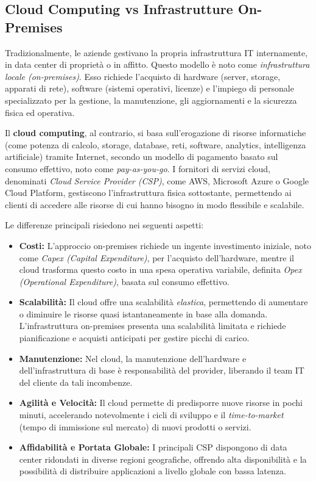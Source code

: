 \subsection{Cloud Computing vs Infrastrutture On-Premises}
\label{sec:cloud-vs-onprem}

Tradizionalmente, le aziende gestivano la propria infrastruttura IT internamente, in data center di proprietà o in affitto. Questo modello è noto come \textit{infrastruttura locale (on-premises)}. Esso richiede l'acquisto di hardware (server, storage, apparati di rete), software (sistemi operativi, licenze) e l'impiego di personale specializzato per la gestione, la manutenzione, gli aggiornamenti e la sicurezza fisica ed operativa.

Il \textbf{cloud computing}, al contrario, si basa sull'erogazione di risorse informatiche (come potenza di calcolo, storage, database, reti, software, analytics, intelligenza artificiale) tramite Internet, secondo un modello di pagamento basato sul consumo effettivo, noto come \textit{pay-as-you-go}. I fornitori di servizi cloud, denominati \textit{Cloud Service Provider (CSP)}, come AWS, Microsoft Azure o Google Cloud Platform, gestiscono l'infrastruttura fisica sottostante, permettendo ai clienti di accedere alle risorse di cui hanno bisogno in modo flessibile e scalabile.

Le differenze principali risiedono nei seguenti aspetti:
\begin{itemize}
    \item \textbf{Costi:} L'approccio on-premises richiede un ingente investimento iniziale, noto come \textit{Capex (Capital Expenditure)}, per l'acquisto dell'hardware, mentre il cloud trasforma questo costo in una spesa operativa variabile, definita \textit{Opex (Operational Expenditure)}, basata sul consumo effettivo.
    \item \textbf{Scalabilità:} Il cloud offre una scalabilità \textit{elastica}, permettendo di aumentare o diminuire le risorse quasi istantaneamente in base alla domanda. L'infrastruttura on-premises presenta una scalabilità limitata e richiede pianificazione e acquisti anticipati per gestire picchi di carico.
    \item \textbf{Manutenzione:} Nel cloud, la manutenzione dell'hardware e dell'infrastruttura di base è responsabilità del provider, liberando il team IT del cliente da tali incombenze.
    \item \textbf{Agilità e Velocità:} Il cloud permette di predisporre nuove risorse in pochi minuti, accelerando notevolmente i cicli di sviluppo e il \textit{time-to-market} (tempo di immissione sul mercato) di nuovi prodotti o servizi.
    \item \textbf{Affidabilità e Portata Globale:} I principali CSP dispongono di data center ridondati in diverse regioni geografiche, offrendo alta disponibilità e la possibilità di distribuire applicazioni a livello globale con bassa latenza.
\end{itemize}

